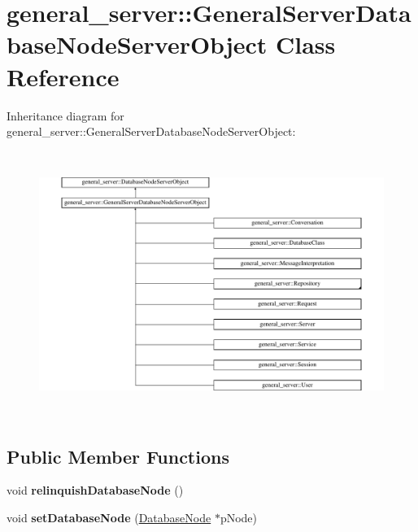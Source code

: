 \hypertarget{classgeneral__server_1_1GeneralServerDatabaseNodeServerObject}{\section{general\-\_\-server\-:\-:\-General\-Server\-Database\-Node\-Server\-Object \-Class \-Reference}
\label{classgeneral__server_1_1GeneralServerDatabaseNodeServerObject}
}
\-Inheritance diagram for general\-\_\-server\-:\-:\-General\-Server\-Database\-Node\-Server\-Object\-:\begin{figure}[H]
\begin{center}
\leavevmode
\includegraphics[height=8.651686cm]{classgeneral__server_1_1GeneralServerDatabaseNodeServerObject}
\end{center}
\end{figure}
\subsection*{\-Public \-Member \-Functions}
\begin{DoxyCompactItemize}
\item 
\hypertarget{classgeneral__server_1_1GeneralServerDatabaseNodeServerObject_a0df3e7984dc67d81b05c1e1ef825e445}{void {\bfseries relinquish\-Database\-Node} ()}\label{classgeneral__server_1_1GeneralServerDatabaseNodeServerObject_a0df3e7984dc67d81b05c1e1ef825e445}

\item 
\hypertarget{classgeneral__server_1_1GeneralServerDatabaseNodeServerObject_acb479b76d842ba89a3ab35f482bdb4c2}{void {\bfseries set\-Database\-Node} (\hyperlink{classgeneral__server_1_1DatabaseNode}{\-Database\-Node} $\ast$p\-Node)}\label{classgeneral__server_1_1GeneralServerDatabaseNodeServerObject_acb479b76d842ba89a3ab35f482bdb4c2}

\end{DoxyCompactItemize}
